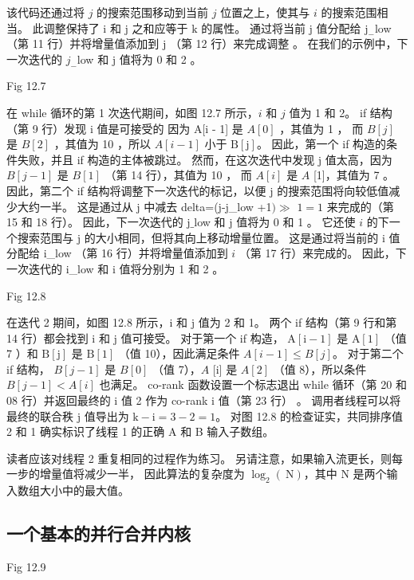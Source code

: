 该代码还通过将 $j$ 的搜索范围移动到当前 $j$ 位置之上，使其与 $i$ 的搜索范围相当。 
此调整保持了 $\mathrm{i}$ 和 $\mathrm{j}$ 之和应等于 $\mathrm{k}$ 的属性。 
通过将当前 $\mathrm{j}$ 值分配给 $\mathrm{j}_{-}$low （第 11 行）并将增量值添加到 $\mathrm{j}$ （第 12 行）来完成调整 。 在我们的示例中，下一次迭代的 $j_{-}$low 和 $\mathrm{j}$ 值将为 0 和 2 。

{\color{red} Fig 12.7}

在 while 循环的第 1 次迭代期间，如图 12.7 所示，$i$ 和 $j$ 值为 1 和 2。
if 结构（第 9 行）发现 $\mathrm{i}$ 值是可接受的 因为 $\mathrm{A}[\mathrm{i}$ - 1] 是 $A[0]$ ，其值为 1 ，
而 $B[j]$ 是 $B[2]$ ，其值为 10 ，所以 $ A[i-1]$ 小于 $\mathrm{B}[\mathrm{j}]$。 
因此，第一个 if 构造的条件失败，并且 if 构造的主体被跳过。 
然而，在这次迭代中发现 $\mathrm{j}$ 值太高，因为 $B[j-1]$ 是 $B[1]$ （第 14 行），其值为 10 ，
而 $A [i]$ 是 $A$ [1]，其值为 7 。 
因此，第二个 if 结构将调整下一次迭代的标记，以便 $\mathrm{j}$ 的搜索范围将向较低值减少大约一半。 
这是通过从 $\mathrm{j}$ 中减去 delta=(j-j\_low +1$) \gg$ $1=1$ 来完成的（第 15 和 18 行）。 
因此，下一次迭代的 $\mathrm{j} \_$low 和 $\mathrm{j}$ 值将为 0 和 1 。 
它还使 $i$ 的下一个搜索范围与 $\mathrm{j}$ 的大小相同，但将其向上移动增量位置。 
这是通过将当前的 $\mathrm{i}$ 值分配给 i\_low （第 16 行）并将增量值添加到 $i$ （第 17 行）来完成的。 
因此，下一次迭代的 i\_low 和 $\mathrm{i}$ 值将分别为 1 和 2 。

{\color{red} Fig 12.8}

在迭代 2 期间，如图 12.8 所示，$\mathrm{i}$ 和 $\mathrm{j}$ 值为 2 和 1。
两个 if 结构（第 9 行和第 14 行）都会找到 $\mathrm{i}$ 和 $\mathrm{j}$ 值可接受。 
对于第一个 if 构造， $\mathrm{A}[\mathrm{i}-1]$ 是 $\mathrm{A}[1]$ （值 7 ）和 $\mathrm{B}[\mathrm{j}] $ 是 $\mathrm{B}[1]$ （值 10），因此满足条件 $A[i-1] \leq B[j]$。 
对于第二个 if 结构， $B[j-1]$ 是 $B[0]$ （值 7），$A$ [i] 是 $A[2]$ （值 8），所以条件 $B [j-1]<A[i]$ 也满足。 
co-rank 函数设置一个标志退出 while 循环（第 20 和 08 行）并返回最终的 $\mathrm{i}$ 值 2 作为 co-rank $\mathrm{i}$ 值（第 23 行） 。 
调用者线程可以将最终的联合秩 $\mathrm{j}$ 值导出为 $\mathrm{k}-\mathrm{i}=3-2=1$。 
对图 12.8 的检查证实，共同排序值 2 和 1 确实标识了线程 1 的正确 A 和 B 输入子数组。

读者应该对线程 2 重复相同的过程作为练习。 
另请注意，如果输入流更长，则每一步的增量值将减少一半，
因此算法的复杂度为 $\log _{2}(\mathrm{~N})$，其中 $\mathrm{N}$ 是两个输入数组大小中的最大值。

\subsection{一个基本的并行合并内核}
{\color{red} Fig 12.9}

